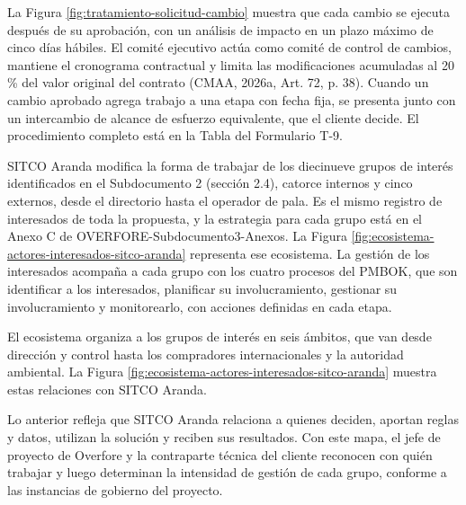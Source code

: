 \documentclass[subdoc]{../../comun/overfore}
\begin{document}
La Figura \ref{fig:tratamiento-solicitud-cambio} muestra que cada cambio se ejecuta después de su aprobación, con un análisis de impacto en un plazo máximo de cinco días hábiles. El comité ejecutivo actúa como comité de control de cambios, mantiene el cronograma contractual y limita las modificaciones acumuladas al 20 \% del valor original del contrato (CMAA, 2026a, Art. 72, p. 38). Cuando un cambio aprobado agrega trabajo a una etapa con fecha fija, se presenta junto con un intercambio de alcance de esfuerzo equivalente, que el cliente decide. El procedimiento completo está en la Tabla  del Formulario T-9.

SITCO Aranda modifica la forma de trabajar de los diecinueve grupos de interés identificados en el Subdocumento 2 (sección 2.4), catorce internos y cinco externos, desde el directorio hasta el operador de pala. Es el mismo registro de interesados de toda la propuesta, y la estrategia para cada grupo está en el Anexo C de OVERFORE-Subdocumento3-Anexos. La Figura \ref{fig:ecosistema-actores-interesados-sitco-aranda} representa ese ecosistema. La gestión de los interesados acompaña a cada grupo con los cuatro procesos del PMBOK, que son identificar a los interesados, planificar su involucramiento, gestionar su involucramiento y monitorearlo, con acciones definidas en cada etapa.

El ecosistema organiza a los grupos de interés en seis ámbitos, que van desde dirección y control hasta los compradores internacionales y la autoridad ambiental. La Figura \ref{fig:ecosistema-actores-interesados-sitco-aranda} muestra estas relaciones con SITCO Aranda.

Lo anterior refleja que SITCO Aranda relaciona a quienes deciden, aportan reglas y datos, utilizan la solución y reciben sus resultados. Con este mapa, el jefe de proyecto de Overfore y la contraparte técnica del cliente reconocen con quién trabajar y luego determinan la intensidad de gestión de cada grupo, conforme a las instancias de gobierno del proyecto.
\end{document}
